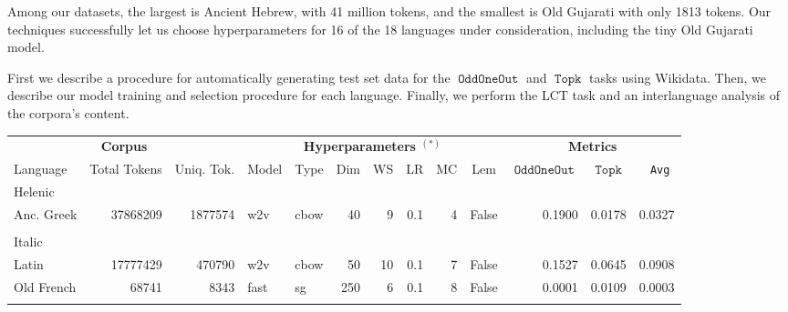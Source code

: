 \documentclass[11pt,a4paper]{article}
\DeclareMathOperator{\OddOneOut}{\texttt{OddOneOut}}
\DeclareMathOperator{\topk}{\texttt{Topk}}
\begin{document}
Among our datasets, the largest is Ancient Hebrew, with 41 million tokens,
and the smallest is Old Gujarati with only 1813 tokens.
Our techniques successfully let us choose hyperparameters for 16 of the 18 languages under consideration,
including the tiny Old Gujarati model.

First we describe a procedure for automatically generating test set data for the $\OddOneOut$ and $\topk$ tasks using Wikidata.
Then, we describe our model training and selection procedure for each language.
Finally, we perform the LCT task and an interlanguage analysis of the corpora's content.




\begin{table}[t]
\centering
\scriptsize
\begin{tabular}{lrrllrrrrlrrr}
\toprule
    \multicolumn{3}{c}{\bf Corpus} & \multicolumn{7}{c}{\bf Hyperparameters $^{(*)}$} & \multicolumn{3}{c}{\bf Metrics} \\
\cmidrule(lr){1-3}\cmidrule(lr){4-10}\cmidrule(lr){11-13}
 \multicolumn{1}{l}{Language} & \multicolumn{1}{r}{Total Tokens} & \multicolumn{1}{r}{Uniq. Tok.} & \multicolumn{1}{l}{Model} & \multicolumn{1}{l}{Type} & \multicolumn{1}{r}{Dim} & \multicolumn{1}{r}{WS} & \multicolumn{1}{r}{LR} & \multicolumn{1}{r}{MC} & \multicolumn{1}{c}{Lem} & \multicolumn{1}{c}{\tiny$\OddOneOut$} & \multicolumn{1}{c}{$\topk$} & \multicolumn{1}{c}{\texttt{ Avg}} \\
    \midrule
    Helenic&&&&&&&&&&&&\\
 \quad Anc. Greek & \num{37868209} & \num{1877574} & w2v & cbow &  \num{40} &  \num{9} &  \num{.1} &  \num{4} & False & 0.1900 & 0.0178 & 0.0327\\
    &&&&&&&&&&&&\\[-4pt]
    Italic&&&&&&&&&&&&\\
 \quad Latin & \num{17777429} & \num{470790} & w2v & cbow &  \num{50} &  \num{10} &  \num{.1} &  \num{7} & False &  0.1527 &  0.0645 & 0.0908\\ 
   \quad Old French  & \num{68741} & \num{8343} &  fast & sg & \num{250} & \num{6} & \num{.1} & \num{8}  & False & 0.0001 & 0.0109 & 0.0003\\
    &&&&&&&&&&&&\\[-4pt]

\end{tabular}
\end{table}
\end{document}
